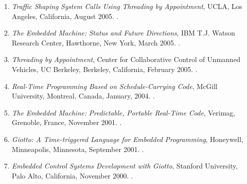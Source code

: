 {\begin{enumerate}
\item \emph{Traffic Shaping System Calls Using Threading by Appointment},
UCLA, Los Angeles, California, August 2005.
.

\item \emph{The Embedded Machine: Status and Future Directions},
IBM T.J. Watson Research Center, Hawthorne, New York, March 2005.
.

\item \emph{Threading by Appointment},
Center for Collaborative Control of Unmanned Vehicles, UC Berkeley, Berkeley, California, February 2005.
.

\item \emph{Real-Time Programming Based on Schedule-Carrying Code},
McGill University, Montreal, Canada, January, 2004.
.

\item \emph{The Embedded Machine: Predictable, Portable Real-Time Code},
Verimag, Grenoble, France, November 2001.
.

\item \emph{Giotto: A Time-triggered Language for Embedded Programming},
Honeywell, Minneapolis, Minnesota, September 2001.
.

\item \emph{Embedded Control Systems Development with Giotto},
Stanford University, Palo Alto, California, November 2000.
.
\end{enumerate}
}
